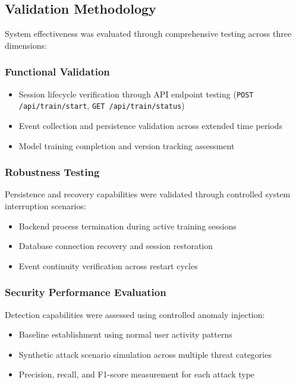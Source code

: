 \documentclass[conference]{IEEEtran}
\begin{document}
\subsection{Validation Methodology}
System effectiveness was evaluated through comprehensive testing across three dimensions:

\subsubsection{Functional Validation}
\begin{itemize}[leftmargin=*]
  \item Session lifecycle verification through API endpoint testing (\texttt{POST /api/train/start}, \texttt{GET /api/train/status})
  \item Event collection and persistence validation across extended time periods
  \item Model training completion and version tracking assessment
\end{itemize}

\subsubsection{Robustness Testing}
Persistence and recovery capabilities
were validated through controlled system interruption scenarios:
\begin{itemize}[leftmargin=*]
  \item Backend process termination during active training sessions
  \item Database connection recovery and session restoration
  \item Event continuity verification across restart cycles
\end{itemize}

\subsubsection{Security Performance Evaluation}
Detection capabilities were assessed using controlled anomaly injection:
\begin{itemize}[leftmargin=*]
  \item Baseline establishment using normal user activity patterns
  \item Synthetic attack scenario simulation across multiple threat categories
  \item Precision, recall, and F1-score measurement for each attack type
\end{itemize}
\end{document}

